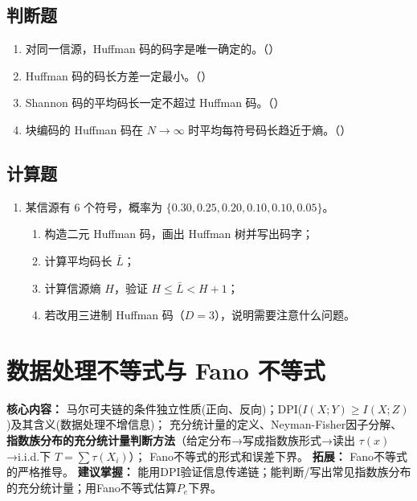 \documentclass[12pt,a4paper]{ctexart}
\begin{document}
\subsection*{判断题}

\begin{enumerate}[label=\arabic*., leftmargin=*]
\item 对同一信源，Huffman 码的码字是唯一确定的。（\quad）
\item Huffman 码的码长方差一定最小。（\quad）
\item Shannon 码的平均码长一定不超过 Huffman 码。（\quad）
\item 块编码的 Huffman 码在 $N \to \infty$ 时平均每符号码长趋近于熵。（\quad）
\end{enumerate}

\subsection*{计算题}

\begin{enumerate}[label=\textbf{\arabic*.}, leftmargin=*]
\item 某信源有 6 个符号，概率为 $\{0.30, 0.25, 0.20, 0.10, 0.10, 0.05\}$。
\begin{enumerate}
  \item 构造二元 Huffman 码，画出 Huffman 树并写出码字；
  \item 计算平均码长 $\bar{L}$；
  \item 计算信源熵 $H$，验证 $H \leq \bar{L} < H + 1$；
  \item 若改用三进制 Huffman 码（$D=3$），说明需要注意什么问题。
\end{enumerate}
\end{enumerate}

\newpage

\section{数据处理不等式与 Fano 不等式}

\begin{notetested}
\textbf{核心内容：} 马尔可夫链的条件独立性质(正向、反向)；DPI($I(X;Y) \geq I(X;Z)$)及其含义(数据处理不增信息)；
充分统计量的定义、Neyman-Fisher因子分解、\textbf{指数族分布的充分统计量判断方法}（给定分布→写成指数族形式→读出 $\tau(x)$→i.i.d.下 $T=\sum\tau(X_i)$）；
Fano不等式的形式和误差下界。
\textbf{拓展：} Fano不等式的严格推导。
\textbf{建议掌握：} 能用DPI验证信息传递链；能判断/写出常见指数族分布的充分统计量；用Fano不等式估算$P_e$下界。
\end{notetested}
\end{document}
